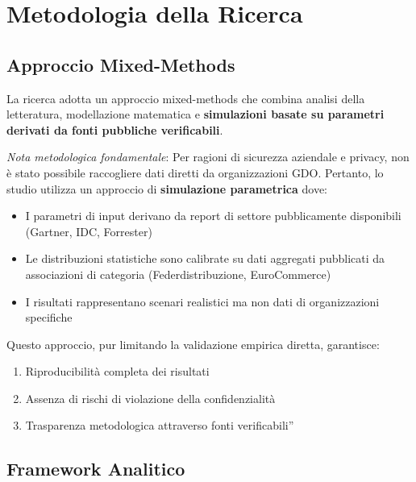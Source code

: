 \documentclass[12pt,a4paper,oneside]{book}
\providecommand{\tightlist}{%
  \setlength{\itemsep}{0pt}\setlength{\parskip}{0pt}
}
\begin{document}
\section{\texorpdfstring{\textbf{Metodologia della
Ricerca}}{1.5 Metodologia della Ricerca}}\label{metodologia-della-ricerca}

\subsection{\texorpdfstring{\textbf{Approccio
Mixed-Methods}}{1.5.1 Approccio Mixed-Methods}}\label{approccio-mixed-methods}

La ricerca adotta un approccio mixed-methods che combina analisi della letteratura, modellazione matematica e \textbf{simulazioni basate su parametri derivati da fonti pubbliche verificabili}.

\emph{Nota metodologica fondamentale}: Per ragioni di sicurezza
aziendale e privacy, non è stato possibile raccogliere dati diretti da organizzazioni GDO. Pertanto, lo studio utilizza un approccio di \textbf{simulazione parametrica} dove:

\begin{itemize}
\tightlist
\item
  I parametri di input derivano da report di settore pubblicamente
  disponibili (Gartner, IDC, Forrester)\\
\item
  Le distribuzioni statistiche sono calibrate su dati aggregati
  pubblicati da associazioni di categoria (Federdistribuzione,
  EuroCommerce)\\
\item
  I risultati rappresentano scenari realistici ma non dati di
  organizzazioni specifiche
\end{itemize}

Questo approccio, pur limitando la validazione empirica diretta,
garantisce:

\begin{enumerate}
\def\labelenumi{\arabic{enumi}.}
\tightlist
\item
  Riproducibilità completa dei risultati\\
\item
  Assenza di rischi di violazione della confidenzialità\\
\item
  Trasparenza metodologica attraverso fonti verificabili''
\end{enumerate}

\subsection{\texorpdfstring{\textbf{Framework
Analitico}}{1.5.2 Framework Analitico}}\label{framework-analitico}
\end{document}
